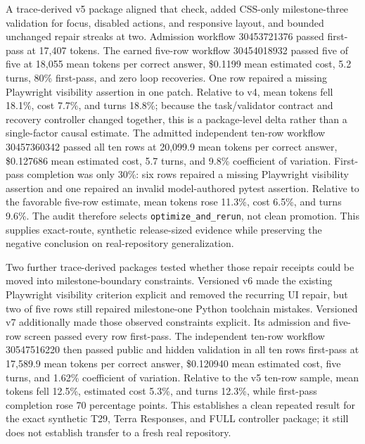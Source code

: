 \documentclass[10pt,twocolumn]{article}
\begin{document}
A trace-derived v5 package aligned that check, added CSS-only milestone-three
validation for focus, disabled actions, and responsive layout, and bounded
unchanged repair streaks at two. Admission workflow 30453721376 passed
first-pass at 17,407 tokens. The earned five-row workflow 30454018932 passed
five of five at 18,055 mean tokens per
correct answer, \$0.1199 mean estimated cost, 5.2 turns, 80\% first-pass, and
zero loop recoveries. One row repaired a missing Playwright visibility
assertion in one patch. Relative to v4, mean tokens fell 18.1\%, cost 7.7\%,
and turns 18.8\%; because the task/validator contract and recovery controller
changed together, this is a package-level delta rather than a single-factor
causal estimate. The admitted independent ten-row workflow 30457360342 passed
all ten rows at 20,099.9 mean tokens per correct answer, \$0.127686 mean
estimated cost, 5.7 turns, and 9.8\% coefficient of variation. First-pass
completion was only 30\%: six rows repaired a missing Playwright visibility
assertion and one repaired an invalid model-authored pytest assertion. Relative
to the favorable five-row estimate, mean tokens rose 11.3\%, cost 6.5\%, and
turns 9.6\%. The audit therefore selects \texttt{optimize\_and\_rerun}, not
clean promotion. This supplies exact-route, synthetic release-sized evidence
while preserving the negative conclusion on real-repository generalization.

Two further trace-derived packages tested whether those repair receipts could
be moved into milestone-boundary constraints. Versioned v6 made the existing
Playwright visibility criterion explicit and removed the recurring UI repair,
but two of five rows still repaired milestone-one Python toolchain mistakes.
Versioned v7 additionally made those observed constraints explicit. Its
admission and five-row screen passed every row first-pass. The independent
ten-row workflow 30547516220 then passed public and hidden validation in all
ten rows first-pass at 17,589.9 mean tokens per correct answer, \$0.120940 mean
estimated cost, five turns, and 1.62\% coefficient of variation. Relative to
the v5 ten-row sample, mean tokens fell 12.5\%, estimated cost 5.3\%, and turns
12.3\%, while first-pass completion rose 70 percentage points. This establishes
a clean repeated result for the exact synthetic T29, Terra Responses, and FULL
controller package; it still does not establish transfer to a fresh real
repository.
\end{document}
